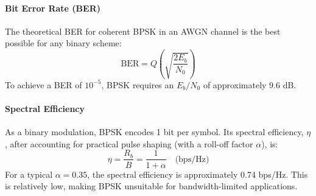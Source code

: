 \paragraph{Bit Error Rate (BER)}
The theoretical BER for coherent BPSK in an AWGN channel is the best possible for any binary scheme:
\begin{equation}
    \text{BER} = Q\left(\sqrt{\frac{2E_b}{N_0}}\right)
\end{equation}
To achieve a BER of $10^{-5}$, BPSK requires an $E_b/N_0$ of approximately 9.6 dB.

\paragraph{Spectral Efficiency}
As a binary modulation, BPSK encodes 1 bit per symbol. Its spectral efficiency, $\eta$, after accounting for practical pulse shaping (with a roll-off factor $\alpha$), is:
\begin{equation}
    \eta = \frac{R_b}{B} = \frac{1}{1+\alpha} \quad \text{(bps/Hz)}
\end{equation}
For a typical $\alpha=0.35$, the spectral efficiency is approximately 0.74 bps/Hz. This is relatively low, making BPSK unsuitable for bandwidth-limited applications.


